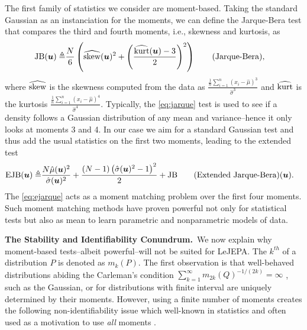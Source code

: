 The first family of statistics we consider are moment-based. Taking the standard Gaussian as an instanciation for the moments, we can define the Jarque-Bera \citep{jarque1980efficient} test that compares the third and fourth moments, i.e., skewness and kurtosis, as
\begin{align}
    {\rm JB}({\bm{u}})\triangleq&\frac{N}{6}\left(\widehat{\rm skew}({\bm{u}})^{2}+\left(\frac{\widehat{\rm kurt}({\bm{u}})-3}{2}\right)^{2}\right)\tag{Jarque-Bera}\label{eq:jarque},
\end{align}
where $\widehat{\rm skew}$ is the skewness computed from the data as $\frac{\frac{1}{n} \sum_{i=1}^{n}\left(x_{i}-\hat{\mu}\right)^{3}}{\hat{\sigma}^{3}}$ and $\widehat{\rm kurt}$ is the kurtosis $\frac{\frac{1}{n} \sum_{i=1}^{n}\left(x_{i}-\hat{\mu}\right)^{4}}{\hat{\sigma}^4}$. Typically, the \eqref{eq:jarque} test is used to see if a density follows a Gaussian distribution of any mean and variance--hence it only looks at moments 3 and 4. In our case we aim for a standard Gaussian test and thus add the usual statistics on the first two moments, leading to the extended test
\begin{align}    
{\rm EJB}({\bm{u}})\triangleq&\frac{N\hat{\mu}({\bm{u}})^2}{\hat{\sigma}({\bm{u}})^2}+\frac{(N-1)\left(\hat{\sigma}({\bm{u}})^2-1\right)^2}{2}+{\rm JB}\tag{Extended Jarque-Bera}({\bm{u}})\label{eq:ejarque}.
\end{align}
The \eqref{eq:ejarque} acts as a moment matching problem over the first four moments. Such moment matching methods have proven powerful not only for statistical tests but also as mean to learn parametric and nonparametric models of data. 


{\bf The Stability and Identifiability Conundrum.}~We now explain why moment-based tests--albeit powerful--will not be suited for LeJEPA. The $k^{th}$ of a distribution $P$ is denoted as $m_k(P)$. The first observation is that well-behaved distributions abiding the Carleman's condition $
\sum_{k=1}^\infty m_{2k}(Q)^{-1/(2k)} = \infty$ \citep{carleman1926fonctions}, such as the Gaussian,  or for distributions with finite interval \citep{hausdorff1923momentprobleme} are uniquely determined by their moments. However, using a finite number of moments creates the following non-identifiability issue which well-known in statistics and often used as a motivation to use {\em all} moments \citep{lehmann2005testing}. 

